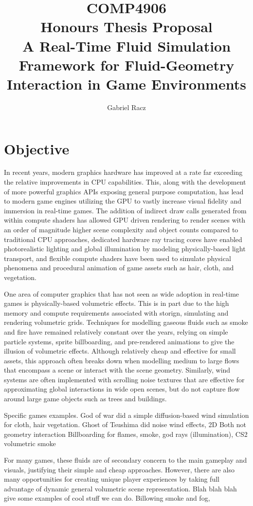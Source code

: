\documentclass[a4paper, 11pt, titlepage]{article}
\title{COMP4906\\
Honours Thesis Proposal\\
A Real-Time Fluid Simulation Framework for Fluid-Geometry Interaction in Game Environments}
\author{Gabriel Racz}
\begin{document}
\maketitle

\section{Objective}
In recent years, modern graphics hardware has improved at a rate far exceeding
the relative improvements in CPU capabilities. This, along with the development
of more powerful graphics APIs exposing general purpose computation, has lead to
modern game engines utilizing the GPU to vastly increase visual fidelity and
immersion in real-time games. The addition of indirect draw calls generated from within
compute shaders has allowed GPU driven rendering to render scenes with an
order of magnitude higher scene complexity and object counts compared to
traditional CPU approaches, dedicated hardware ray tracing cores have enabled
photorealistic lighting and global illumination by modeling physically-based
light transport, and flexible compute shaders have been used to simulate
physical phenomena and procedural animation of game assets such as hair, cloth,
and vegetation.

One area of computer graphics that has not seen as wide adoption in
real-time games is physically-based volumetric effects. This is in part due to
the high memory and compute requirements associated with storign, simulating
and rendering volumetric grids. Techniques for modelling gaseous fluids
such as smoke and fire have remained relatively constant over the years, relying
on simple particle systems, sprite billboarding, and pre-rendered animations to give the illusion of
volumetric effects. Although relatively cheap and effective for small
assets, this approach often breaks down when modelling medium to large flows
that encompass a scene or interact with the scene geometry. Similarly, wind
systems are often implemented with scrolling noise textures that are effective
for approximating global interactions in wide open scenes, but do not capture
flow around large game objects such as trees and buildings.

Specific games examples.
God of war did a simple diffusion-based wind simulation for cloth, hair
vegetation.
Ghost of Tsushima did noise wind effects, 2D
Both not geometry interaction
Billboarding for flames, smoke, god rays (illumination),
CS2 volumetric smoke

For many games, these fluids are of secondary concern to the main gameplay and
visuals, justifying their simple and cheap approaches. However, there are also
many opportunities for creating unique player experiences by taking full
advantage of dynamic general volumetric scene representation. Blah blah blah
give some examples of cool stuff we can do. Billowing smoke and fog, 
\end{document}

